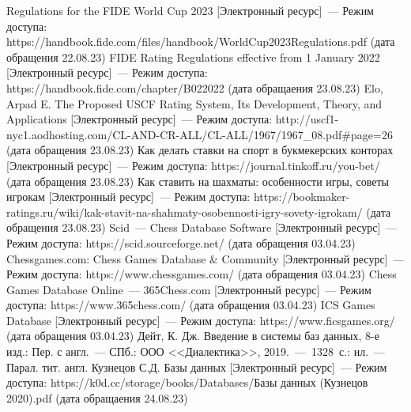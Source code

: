 \begin{thebibliography}{}
	 Regulations for the FIDE World Cup 2023 [Электронный ресурс]~--- Режим доступа: https://handbook.fide.com/files/handbook/WorldCup2023Regulations.pdf (дата обращения 22.08.23)
	 FIDE Rating Regulations effective from 1 January 2022 [Электронный ресурс]~--- Режим доступа: https://handbook.fide.com/chapter/B022022 (дата обращаения 23.08.23)
	 Elo, Arpad E. The Proposed USCF Rating System, Its Development, Theory, and Applications [Электронный ресурс]~--- Режим доступа: http://uscf1-nyc1.aodhosting.com/CL-AND-CR-ALL/CL-ALL/1967/1967\_08.pdf\#page=26 (дата обращения 23.08.23)
	 Как делать ставки на спорт в букмекерских конторах [Электронный ресурс]~--- Режим доступа: https://journal.tinkoff.ru/you-bet/ (дата обращения 23.08.23)
	 Как ставить на шахматы: особенности игры, советы игрокам [Электронный ресурс]~--- Режим доступа: https://bookmaker-ratings.ru/wiki/kak-stavit-na-shahmaty-osobennosti-igry-sovety-igrokam/ (дата обращения 23.08.23)
	 Scid~--- Chess Database Software [Электронный ресурс]~--- Режим доступа: https://scid.sourceforge.net/ (дата обращения 03.04.23)
	 Chessgames.com: Chess Games Database \& Community [Электронный ресурс]~--- Режим доступа: https://www.chessgames.com/ (дата обращения 03.04.23)
	 Chess Games Database Online~--- 365Chess.com [Электронный ресурс]~--- Режим доступа: https://www.365chess.com/ (дата обращения 03.04.23)
	 ICS Games Database [Электронный ресурс]~--- Режим доступа: https://www.ficsgames.org/ (дата обращения 03.04.23)
	 Дейт, К. Дж. Введение в системы баз данных, 8-е изд.: Пер. с англ.~--- СПб.: ООО <<Диалектика>>, 2019.~---~1328~с.: ил.~--- Парал. тит. англ.
	 Кузнецов С.Д. Базы данных [Электронный ресурс]~--- Режим доступа: https://k0d.cc/storage/books/Databases/Базы данных (Кузнецов 2020).pdf (дата обращаения 24.08.23)
\end{thebibliography}
